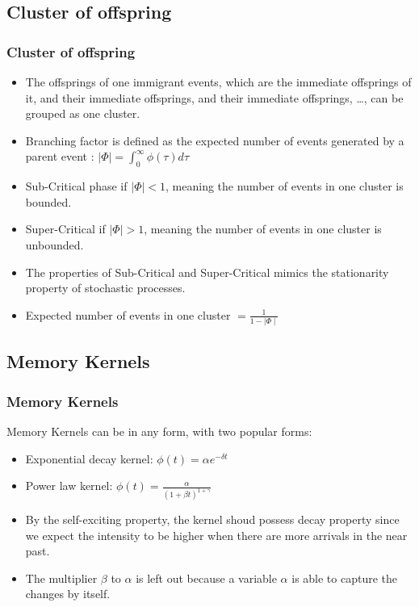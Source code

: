\documentclass{beamer}
\begin{document}
\subsection{Cluster of offspring}
\begin{frame}
\frametitle{Cluster of offspring}
\begin{itemize}
	\item The offsprings of one immigrant events, which are the immediate offsprings of it, and their immediate offsprings, and their immediate offsprings, \dots, can be grouped as one cluster.
	\item Branching factor is defined as the expected number of events generated by a parent event : $\mid \Phi \mid = \int_0^{\infty} \phi(\tau) d\tau$
	\item Sub-Critical phase if $\mid \Phi \mid < 1$, meaning the number of events in one cluster is bounded.
	\item Super-Critical if $\mid \Phi \mid > 1$, meaning the number of events in one cluster is unbounded.
	\item The properties of Sub-Critical and Super-Critical mimics the stationarity property of stochastic processes.
	\item Expected number of events in one cluster $ = \frac{1}{1 - \mid \Phi \mid}$
\end{itemize}
\end{frame}

\subsection{Memory Kernels}
\begin{frame}
\frametitle{Memory Kernels}
Memory Kernels can be in any form, with two popular forms:
\begin{itemize}
	\item Exponential decay kernel: $\phi(t) = \alpha e^{-\delta t}$
	\item Power law kernel: $\phi(t) = \frac{\alpha}{(1 + \beta t)^{1 + \gamma}}$
	\item By the self-exciting property, the kernel shoud possess decay property since we expect the intensity to be higher when there are more arrivals in the near past.
	\item The multiplier $\beta$ to $\alpha$ is left out because a variable $\alpha$ is able to capture the changes by itself.
\end{itemize}
\end{frame}
\end{document}
